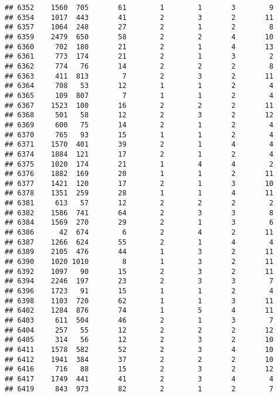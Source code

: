 \documentclass[]{article}
\begin{document}
\begin{verbatim}
## 6352    1560  705       61        1        1       3        9
## 6354    1017  443       41        2        3       2       11
## 6357    1064  248       27        2        1       2        8
## 6359    2479  650       58        2        2       4       10
## 6360     702  180       21        2        1       4       13
## 6361     773  174       21        2        1       3        2
## 6362     774   76       14        2        2       2        8
## 6363     411  813        7        2        3       2       11
## 6364     708   53       12        1        1       2        4
## 6365     109  807        7        1        1       2        4
## 6367    1523  100       16        2        2       2       11
## 6368     501   58       12        2        3       2       12
## 6369     600   75       14        2        1       2        4
## 6370     765   93       15        1        1       2        4
## 6371    1570  401       39        2        1       4        4
## 6374    1884  121       17        2        1       2        4
## 6375    1020  174       21        1        4       4        2
## 6376    1882  169       20        1        1       2       11
## 6377    1421  120       17        2        1       3       10
## 6378    1351  259       28        1        1       4       11
## 6381     613   57       12        2        2       2        2
## 6382    1586  741       64        2        3       3        8
## 6384    1569  270       29        2        1       3        6
## 6386      42  674        6        2        4       2       11
## 6387    1266  624       55        2        1       4        4
## 6389    2105  476       44        1        3       2       11
## 6390    1020 1010        8        1        3       2       11
## 6392    1097   90       15        2        3       2       11
## 6394    2246  197       23        2        3       3        7
## 6396    1723   91       15        1        1       2        4
## 6398    1103  720       62        1        1       3       11
## 6402    1284  876       74        1        5       4       11
## 6403     611  504       46        2        1       3        7
## 6404     257   55       12        2        2       2       12
## 6405     314   56       12        2        3       2       10
## 6411    1578  582       52        2        3       4       10
## 6412    1941  384       37        2        2       2       10
## 6416     716   88       15        2        3       2       12
## 6417    1749  441       41        2        3       4        4
## 6419     843  973       82        2        1       2        7

\end{verbatim}
\end{document}
